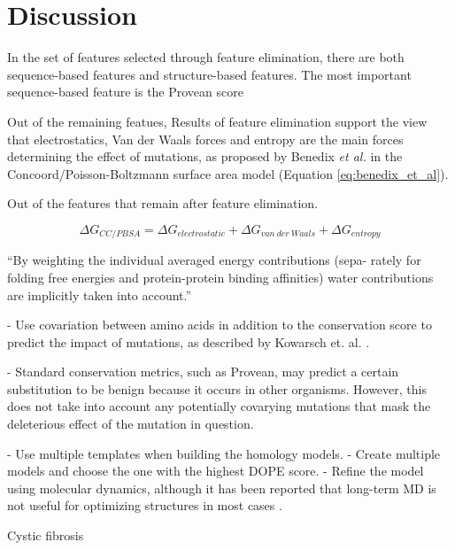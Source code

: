 
\chapter{Discussion} \label{chap:discussion}



In the set of features selected through feature elimination, there are both sequence-based features and structure-based features. The most important sequence-based feature is the Provean score

Out of the remaining featues,
Results of feature elimination support the view that electrostatics, Van der Waals forces and entropy are the main forces determining the effect of mutations, as proposed by Benedix \textit{et al.} in the Concoord/Poisson-Boltzmann surface area model (Equation \ref{eq:benedix_et_al}).

Out of the features that remain after feature elimination.

\begin{equation} \label{eq:benedix_et_al}
    \Delta G_{CC/PBSA} = \Delta G_{electrostatic} + \Delta G_{van\ der\ Waals} + \Delta G_{entropy}
\end{equation}

``By weighting the individual averaged energy contributions (sepa-
rately for folding free energies and protein-protein binding affinities)
water contributions are implicitly taken into account.''


- Use covariation between amino acids in addition to the conservation score to predict the impact of mutations, as described by Kowarsch et. al. \cite{kowarsch_correlated_2010}.

- Standard conservation metrics, such as Provean, may predict a certain substitution to be benign because it occurs in other organisms. However, this does not take into account any potentially covarying mutations that mask the deleterious effect of the mutation in question.



- Use multiple templates when building the homology models.
- Create multiple models and choose the one with the highest DOPE score.
- Refine the model using molecular dynamics, although it has been reported that long-term MD is not useful for optimizing structures in most cases \cite{raval_refinement_2012}.




Cystic fibrosis




